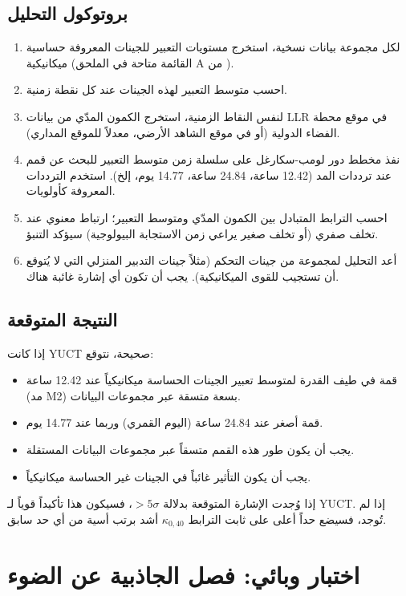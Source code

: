 \documentclass[11pt,a4paper]{article}
\theoremstyle{remark}
\begin{document}
	\subsection{بروتوكول التحليل}
	
	\begin{enumerate}
		\item لكل مجموعة بيانات نسخية، استخرج مستويات التعبير للجينات المعروفة حساسية ميكانيكية (القائمة متاحة في الملحق A من \cite{NASA-GeneLab}).
		\item احسب متوسط التعبير لهذه الجينات عند كل نقطة زمنية.
		\item لنفس النقاط الزمنية، استخرج الكمون المدّي من بيانات LLR في موقع محطة الفضاء الدولية (أو في موقع الشاهد الأرضي، معدلاً للموقع المداري).
		\item نفذ مخطط دور لومب-سكارغل على سلسلة زمن متوسط التعبير للبحث عن قمم عند ترددات المد (12.42 ساعة، 24.84 ساعة، 14.77 يوم، إلخ). استخدم الترددات المعروفة كأولويات.
		\item احسب الترابط المتبادل بين الكمون المدّي ومتوسط التعبير؛ ارتباط معنوي عند تخلف صفري (أو تخلف صغير يراعي زمن الاستجابة البيولوجية) سيؤكد التنبؤ.
		\item أعد التحليل لمجموعة من جينات التحكم (مثلاً جينات التدبير المنزلي التي لا يُتوقع أن تستجيب للقوى الميكانيكية). يجب أن تكون أي إشارة غائبة هناك.
	\end{enumerate}
	
	\subsection{النتيجة المتوقعة}
	
	إذا كانت YUCT صحيحة، نتوقع:
	\begin{itemize}
		\item قمة في طيف القدرة لمتوسط تعبير الجينات الحساسة ميكانيكياً عند 12.42 ساعة (مد M2) بسعة متسقة عبر مجموعات البيانات.
		\item قمة أصغر عند 24.84 ساعة (اليوم القمري) وربما عند 14.77 يوم.
		\item يجب أن يكون طور هذه القمم متسقاً عبر مجموعات البيانات المستقلة.
		\item يجب أن يكون التأثير غائباً في الجينات غير الحساسة ميكانيكياً.
	\end{itemize}
	
	إذا وُجدت الإشارة المتوقعة بدلالة \(> 5\sigma\)، فسيكون هذا تأكيداً قوياً لـ YUCT. إذا لم تُوجد، فسيضع حداً أعلى على ثابت الترابط \(\kappa_{0,40}\) أشد برتب أسية من أي حد سابق.
	
	\section{اختبار وبائي: فصل الجاذبية عن الضوء}
	\label{sec:epidemiology}
	
\end{document}
